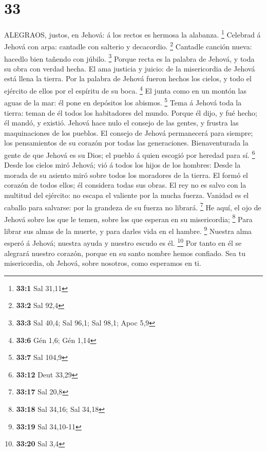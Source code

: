\hypertarget{section-32}{%
\section{33}\label{section-32}}

 ALEGRAOS, justos, en Jehová: á los rectos es hermosa la
alabanza. \footnote{\textbf{33:1} Sal 31,11}  Celebrad á
Jehová con arpa: cantadle con salterio y decacordio. \footnote{\textbf{33:2}
  Sal 92,4}  Cantadle canción nueva: hacedlo bien tañendo
con júbilo. \footnote{\textbf{33:3} Sal 40,4; Sal 96,1; Sal 98,1; Apoc
  5,9}  Porque recta es la palabra de Jehová, y toda su obra
con verdad hecha.  El ama justicia y juicio: de la
misericordia de Jehová está llena la tierra.  Por la palabra
de Jehová fueron hechos los cielos, y todo el ejército de ellos por el
espíritu de su boca. \footnote{\textbf{33:6} Gén 1,6; Gén 1,14}
 El junta como en un montón las aguas de la mar: él pone en
depósitos los abismos. \footnote{\textbf{33:7} Sal 104,9} 
Tema á Jehová toda la tierra: teman de él todos los habitadores del
mundo.  Porque él dijo, y fué hecho; él mandó, y existió.
 Jehová hace nulo el consejo de las gentes, y frustra las
maquinaciones de los pueblos.  El consejo de Jehová
permanecerá para siempre; los pensamientos de su corazón por todas las
generaciones.  Bienaventurada la gente de que Jehová es su
Dios; el pueblo á quien escogió por heredad para sí. \footnote{\textbf{33:12}
  Deut 33,29}  Desde los cielos miró Jehová; vió á todos
los hijos de los hombres:  Desde la morada de su asiento
miró sobre todos los moradores de la tierra.  El formó el
corazón de todos ellos; él considera todas sus obras.  El
rey no es salvo con la multitud del ejército: no escapa el valiente por
la mucha fuerza.  Vanidad es el caballo para salvarse: por
la grandeza de su fuerza no librará. \footnote{\textbf{33:17} Sal 20,8}
 He aquí, el ojo de Jehová sobre los que le temen, sobre
los que esperan en su misericordia; \footnote{\textbf{33:18} Sal 34,16;
  Sal 34,18}  Para librar sus almas de la muerte, y para
darles vida en el hambre. \footnote{\textbf{33:19} Sal 34,10-11}
 Nuestra alma esperó á Jehová; nuestra ayuda y nuestro
escudo es él. \footnote{\textbf{33:20} Sal 3,4}  Por tanto
en él se alegrará nuestro corazón, porque en su santo nombre hemos
confiado.  Sea tu misericordia, oh Jehová, sobre nosotros,
como esperamos en ti.

